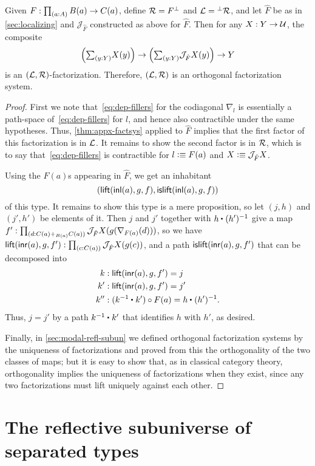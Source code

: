 \begin{thm}
  Given $F:\prd{a:A} B(a) \to C(a)$, define $\mathcal{R} = F^{\perp}$ and $\mathcal{L} = {}^{\perp}\mathcal{R}$, and let $\hat F$ be as in \cref{sec:localizing} and $\mathcal{J}_{\hat F}$ constructed as above for $\hat F$.
  Then for any $X:Y\to\mathcal{U}$, the composite
  \[ \Big(\sm{y:Y} X(y)\Big) \to \Big(\sm{y:Y} \mathcal{J}_{\hat F} X(y)\Big) \to Y \]
  is an $(\mathcal{L},\mathcal{R})$-factorization.
  Therefore, $(\mathcal{L},\mathcal{R})$ is an orthogonal factorization system.
\end{thm}
\begin{proof}
  First we note that~\eqref{eq:dep-fillers} for the codiagonal $\nabla_l$ is essentially a path-space of~\eqref{eq:dep-fillers} for $l$, and hence also contractible under the same hypotheses.
  Thus, \cref{thm:appx-factsys} applied to $\hat F$ implies that the first factor of this factorization is in $\mathcal{L}$.
  It remains to show the second factor is in $\mathcal{R}$, which is to say that~\eqref{eq:dep-fillers} is contractible for $l\vcentcolon\equiv F(a)$ and $X\vcentcolon\equiv \mathcal{J}_{\hat F} X$.

  Using the $F(a)$s appearing in $\hat F$, we get an inhabitant
  \[(\mathsf{lift}({\mathsf{inl}}(a),g,f),\mathsf{islift}({\mathsf{inl}}(a),g,f))\]
  of this type.
  It remains to show this type is a mere proposition, so let $(j,h)$ and $(j',h')$ be elements of it.
  Then $j$ and $j'$ together with $\ct{h}{(h')^{-1}}$ give a map $f':\prd{d:C(a) +_{B(a)} C(a)} \mathcal{J}_{\hat F} X(g(\nabla_{F(a)}(d)))$, so we have $\mathsf{lift}(\inr(a),g,f') :\prd{c:C(a)} \mathcal{J}_{\hat F} X(g(c))$, and a path $\mathsf{islift}({\mathsf{inr}}(a),g,f')$ that can be decomposed into
  \begin{align*}
    k &: \mathsf{lift}(\inr(a),g,f') = j\\
    k' &: \mathsf{lift}(\inr(a),g,f') = j'\\
    k'' &: (\ct{k^{-1}}{k'}) \circ F(a) = \ct{h}{(h')^{-1}}.
  \end{align*}
  Thus, $j=j'$ by a path $\ct{k^{-1}}{k'}$ that identifies $h$ with $h'$, as desired.

  Finally, in \cref{sec:modal-refl-subun} we defined orthogonal factorization systems by the uniqueness of factorizations and proved from this the orthogonality of the two classes of maps; but it is easy to show that, as in classical category theory, orthogonality implies the uniqueness of factorizations when they exist, since any two factorizations must lift uniquely against each other.
\end{proof}

\section{The reflective subuniverse of separated types}

